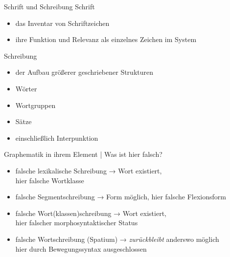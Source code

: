 \begin{frame}
  {Schrift und Schreibung}
  \onslide<+->
  \onslide<+->
  \alert{Schrift}\\
  \Halbzeile
  \begin{itemize}[<+->]
    \item das Inventar von Schriftzeichen
    \item ihre Funktion und Relevanz als einzelnes Zeichen im System
  \end{itemize}
  \onslide<+->
  \Zeile
  \alert{Schreibung}\\
  \Halbzeile
  \begin{itemize}[<+->]
    \item der Aufbau größerer geschriebener Strukturen
    \item Wörter
    \item Wortgruppen
    \item Sätze
    \item einschließlich Interpunktion
  \end{itemize}
\end{frame}

\begin{frame}
  {Graphematik in ihrem Element | Was ist hier falsch?}
  \onslide<+->
  \onslide<+-> 
  \begin{exe}
    \ex\label{ex:graphematikalsteildergrammatik001}
    \begin{xlist}
      \onslide<+->
      \onslide<+->
      \onslide<+->
    \end{xlist}
  \end{exe}
  \begin{itemize}[<+->]
    \item falsche lexikalische Schreibung → Wort existiert,\\
      \alert{hier falsche Wortklasse}
    \item falsche Segmentschreibung → Form möglich, \alert{hier falsche Flexionsform}
    \item falsche Wort(klassen)schreibung → Wort existiert,\\
      \alert{hier falscher morphosyntaktischer Status}
    \item falsche Wortschreibung (Spatium) → \textit{zurückbleibt} anderswo möglich\\
      \alert{hier durch Bewegungssyntax ausgeschlossen}
  \end{itemize}
\end{frame}

